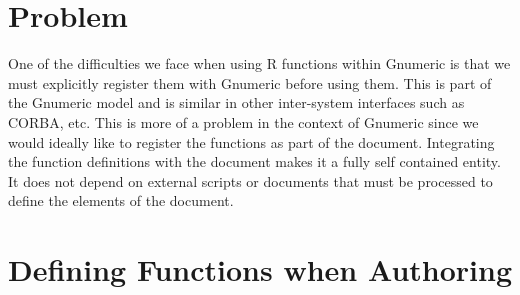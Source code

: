 \documentclass{article}
\begin{document}
\section{Problem}

One of the difficulties we face when using R functions within Gnumeric
is that we must explicitly register them with Gnumeric before using
them.  This is part of the Gnumeric model and is similar in other
inter-system interfaces such as CORBA, etc.  This is more of a problem
in the context of Gnumeric since we would ideally like to register the
functions as part of the document. Integrating the function
definitions with the document makes it a fully self contained entity.
It does not depend on external scripts or documents that must be
processed to define the elements of the document.

\section{Defining Functions when Authoring}
\end{document}
